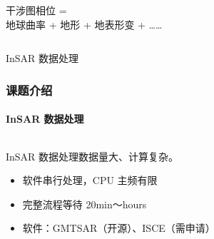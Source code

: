 \documentclass{beamer}
\begin{document}
\begin{frame}
\begin{columns}
\begin{column}{0.5\textwidth}
            ~\\~\\
            干涉图相位 = \\
            地球曲率 + 地形 + 地表形变 + ……
        \end{column}
    \end{columns}
\end{frame}

\begin{frame}{InSAR 数据处理}
    \frametitle{课题介绍}
    \framesubtitle{InSAR 数据处理}

    \begin{columns}
        \begin{column}{0.6\textwidth}
            \begin{footnotesize}
            InSAR 数据处理数据量大、计算复杂。\\
            \begin{itemize}
                \item 软件串行处理，CPU 主频有限
                \item 完整流程等待 20min～hours
                \item 软件：GMTSAR（开源）、ISCE（需申请）
            \end{itemize}


\end{footnotesize}
\end{column}
\end{columns}
\end{frame}
\end{document}
